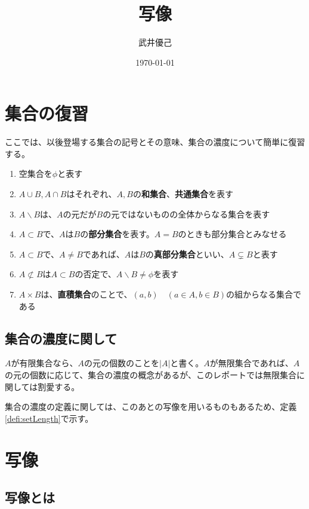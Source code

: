 \documentclass[dvipdfmx,autodetect-engine]{jsarticle}
\title{写像}
\author{武井優己}
\date{\today}
\begin{document}
\maketitle

\section{集合の復習}

ここでは、以後登場する集合の記号とその意味、集合の濃度について簡単に復習する。


\begin{enumerate}
\renewcommand{\labelenumi}{(\arabic{enumi})}
\item 空集合を$\phi$と表す
\item $A \cup B, A \cap B$はそれぞれ、$A,B$の{\bf 和集合}、{\bf 共通集合}を表す
\item $A \backslash B$は、$A$の元だが$B$の元ではないものの全体からなる集合を表す
\item $A \subset B$で、$A$は$B$の{\bf 部分集合}を表す。$A = B$のときも部分集合とみなせる
\item $A \subset B$で、$A \neq B$であれば、$A$は$B$の{\bf 真部分集合}といい、$A \subsetneq B$と表す
\item $A \not\subset B$は$A \subset B$の否定で、$A \backslash B \neq \phi$を表す
\item $A \times B$は、{\bf 直積集合}のことで、$(a, b) \quad (a \in A, b \in B)$の組からなる集合である
\end{enumerate}

\subsection{集合の濃度に関して}

$A$が有限集合なら、$A$の元の個数のことを$|A|$と書く。$A$が無限集合であれば、$A$の元の個数に応じて、集合の濃度の概念があるが、このレポートでは無限集合に関しては割愛する。

集合の濃度の定義に関しては、このあとの写像を用いるものもあるため、定義\ref{defi:setLength}で示す。

\section{写像}

\subsection{写像とは}
\end{document}
